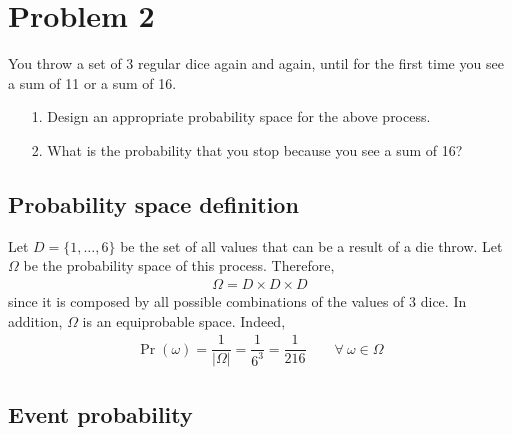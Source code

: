 
\section{Problem 2}

You throw a set of 3 regular dice again and again, until for the first time you see a
sum of 11 or a sum of 16.
\begin{itemize}
	\item[1.] Design an appropriate probability space for the above process.
	\item[2.] What is the probability that you stop because you see a sum of 16?
\end{itemize}

\subsection{Probability space definition}

Let $D = \{1, \ldots, 6\}$ be the set of all values that can be a result of a die throw. Let $\Omega$ be the probability space of this process. Therefore,
\begin{align*}
	\Omega = D \times D \times D
\end{align*}
since it is composed by all possible combinations of the values of 3 dice. In addition, $\Omega$ is an equiprobable space. Indeed,
\begin{align*}
	\Pr(\omega) = \dfrac{1}{|\Omega|} = \dfrac{1}{6^3} = \dfrac{1}{216} \qquad \forall \ \omega\in\Omega
\end{align*}

\subsection{Event probability}


